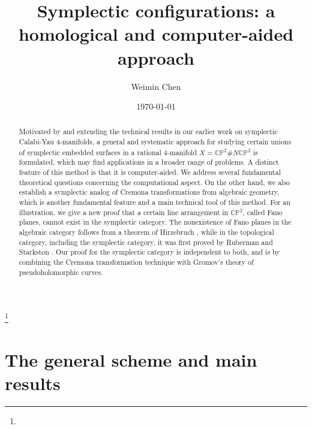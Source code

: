 \documentclass[11pt]{amsart}
\theoremstyle{plain}
\numberwithin{theorem}{section}
\theoremstyle{definition}
\newcommand{\C}{{\mathbb C}}
\renewcommand{\P}{{\mathbb P}}
\begin{document}
\title{Symplectic configurations: a homological and computer-aided approach}
\author{Weimin Chen}
\subjclass[2000]{}
\keywords{}
\thanks{}
\date{\today}
\maketitle
\begin{abstract}
Motivated by and extending the technical results in our earlier work \cite{C,C1} on symplectic Calabi-Yau $4$-manifolds, a general and systematic approach for studying certain unions of symplectic embedded surfaces in a rational $4$-manifold $X=\C\P^2\# N\overline{\C\P^2}$ is formulated, which may find applications in a broader 
range of problems. A distinct feature of this method is that it is computer-aided.  We address several fundamental theoretical questions concerning the computational aspect. On the other hand, we also establish a symplectic analog of Cremona transformations from algebraic geometry, which is another fundamental feature and a main technical tool of this method. For an illustration, we give a new proof that a certain line arrangement in $\C\P^2$, called Fano planes, cannot exist in the symplectic category. The nonexistence of Fano planes in the algebraic category follows from a theorem of Hirzebruch \cite{H}, while in the topological category, including the symplectic category, it was first proved by Ruberman and Starkston \cite{RuS}. Our proof for the symplectic category is independent to both, and is by combining the Cremona transformation technique with Gromov's theory of pseudoholomorphic curves. 
\end{abstract}
\tableofcontents

\section{The general scheme and main results}
\end{document}
